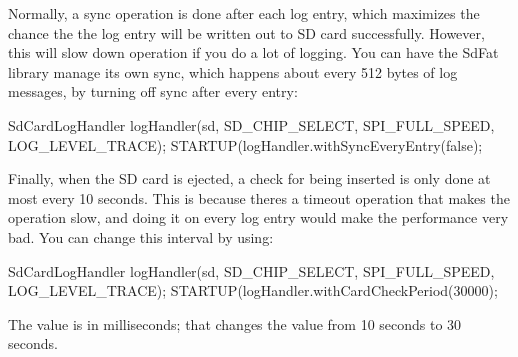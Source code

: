 Normally, a sync operation is done after each log entry, which maximizes the chance the the log entry will be written out to SD card successfully. However, this will slow down operation if you do a lot of logging. You can have the Sd\+Fat library manage its own sync, which happens about every 512 bytes of log messages, by turning off sync after every entry\+:


\begin{DoxyCode}
SdCardLogHandler logHandler(sd, SD\_CHIP\_SELECT, SPI\_FULL\_SPEED, LOG\_LEVEL\_TRACE);
STARTUP(logHandler.withSyncEveryEntry(false);
\end{DoxyCode}


Finally, when the SD card is ejected, a check for being inserted is only done at most every 10 seconds. This is because there\textquotesingle{}s a timeout operation that makes the operation slow, and doing it on every log entry would make the performance very bad. You can change this interval by using\+:


\begin{DoxyCode}
SdCardLogHandler logHandler(sd, SD\_CHIP\_SELECT, SPI\_FULL\_SPEED, LOG\_LEVEL\_TRACE);
STARTUP(logHandler.withCardCheckPeriod(30000);
\end{DoxyCode}


The value is in milliseconds; that changes the value from 10 seconds to 30 seconds. 
